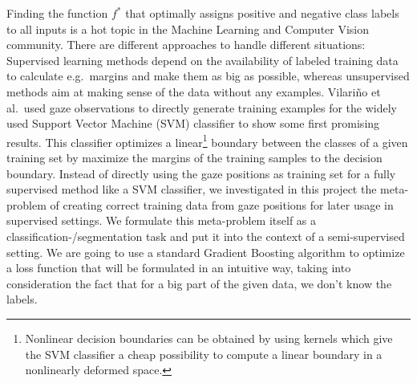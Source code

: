 Finding the function $f^*$ that optimally assigns positive and negative class labels to all inputs is a hot topic in the Machine Learning and Computer Vision community. 
There are different approaches to handle different situations: Supervised learning methods depend on the availability of labeled training data to calculate e.g.\ margins and make them as big as possible, whereas unsupervised methods aim at making sense of the data without any examples. 
Vilari\~no et al.\ used gaze observations to directly generate training examples for the widely used Support Vector Machine (SVM) classifier to show some first promising results. 
This classifier optimizes a linear\footnote{Nonlinear decision boundaries can be obtained by using kernels which give the SVM classifier a cheap possibility to compute a linear boundary in a nonlinearly deformed space.} boundary between the classes of a given training set by maximize the margins of the training samples to the decision boundary. Instead of directly using the gaze positions as training set for a fully supervised method like a SVM classifier, we investigated in this project the meta-problem of creating correct training data from gaze positions for later usage in supervised settings. 
We formulate this meta-problem itself as a classification-/segmentation task and put it into the context of a semi-supervised setting. 
We are going to use a standard Gradient Boosting algorithm to optimize a loss function that will be formulated in an intuitive way, taking into consideration the fact that for a big part of the given data, we don't know the labels.

